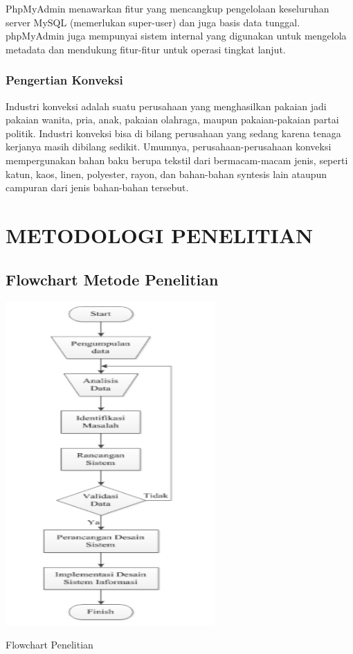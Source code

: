 \documentclass{jtetiproposalskripsi}
\begin{document}
PhpMyAdmin menawarkan fitur yang mencangkup pengelolaan keseluruhan server MySQL (memerlukan super-user) dan juga basis data tunggal. phpMyAdmin juga mempunyai sistem internal yang digunakan untuk mengelola metadata dan mendukung fitur-fitur untuk operasi tingkat lanjut.


\subsection{Pengertian Konveksi }

Industri konveksi adalah suatu perusahaan yang menghasilkan pakaian jadi  pakaian wanita, pria, anak, pakaian olahraga, maupun pakaian-pakaian partai politik. Industri konveksi bisa di bilang perusahaan yang sedang karena tenaga kerjanya masih dibilang sedikit. Umumnya, perusahaan-perusahaan konveksi mempergunakan bahan baku berupa tekstil dari bermacam-macam jenis, seperti katun, kaos, linen, polyester, rayon, dan bahan-bahan syntesis lain ataupun campuran dari jenis bahan-bahan tersebut.



\chapter{METODOLOGI PENELITIAN}

\section{Flowchart Metode Penelitian}

\begin{table}[ht!]
  \centering
    \includegraphics[width=0.6\textwidth]{gambar/FC}
    \caption{Flowchart Penelitian}
    \label{wsn}
\end{table}
\newpage
\end{document}

